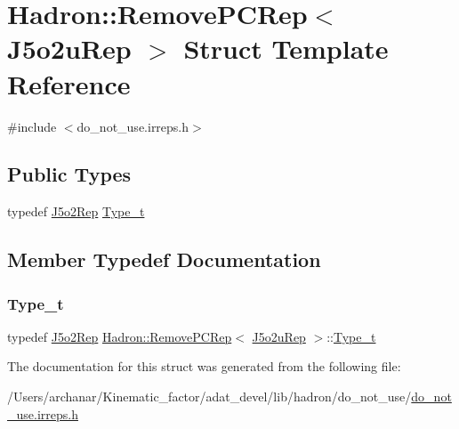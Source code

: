 \hypertarget{structHadron_1_1RemovePCRep_3_01J5o2uRep_01_4}{}\section{Hadron\+:\+:Remove\+P\+C\+Rep$<$ J5o2u\+Rep $>$ Struct Template Reference}
\label{structHadron_1_1RemovePCRep_3_01J5o2uRep_01_4}


{\ttfamily \#include $<$do\+\_\+not\+\_\+use.\+irreps.\+h$>$}

\subsection*{Public Types}
\begin{DoxyCompactItemize}
\item 
typedef \mbox{\hyperlink{structHadron_1_1J5o2Rep}{J5o2\+Rep}} \mbox{\hyperlink{structHadron_1_1RemovePCRep_3_01J5o2uRep_01_4_a374ffbe381e7e02b182dabe0c22a5213}{Type\+\_\+t}}
\end{DoxyCompactItemize}


\subsection{Member Typedef Documentation}
\mbox{\label{structHadron_1_1RemovePCRep_3_01J5o2uRep_01_4_a374ffbe381e7e02b182dabe0c22a5213}} 
\subsubsection{\texorpdfstring{Type\_t}{Type\_t}}
{\footnotesize\ttfamily typedef \mbox{\hyperlink{structHadron_1_1J5o2Rep}{J5o2\+Rep}} \mbox{\hyperlink{structHadron_1_1RemovePCRep}{Hadron\+::\+Remove\+P\+C\+Rep}}$<$ \mbox{\hyperlink{structHadron_1_1J5o2uRep}{J5o2u\+Rep}} $>$\+::\mbox{\hyperlink{structHadron_1_1RemovePCRep_3_01J5o2uRep_01_4_a374ffbe381e7e02b182dabe0c22a5213}{Type\+\_\+t}}}



The documentation for this struct was generated from the following file\+:\begin{DoxyCompactItemize}
\item 
/\+Users/archanar/\+Kinematic\+\_\+factor/adat\+\_\+devel/lib/hadron/do\+\_\+not\+\_\+use/\mbox{\hyperlink{do__not__use_8irreps_8h}{do\+\_\+not\+\_\+use.\+irreps.\+h}}\end{DoxyCompactItemize}

